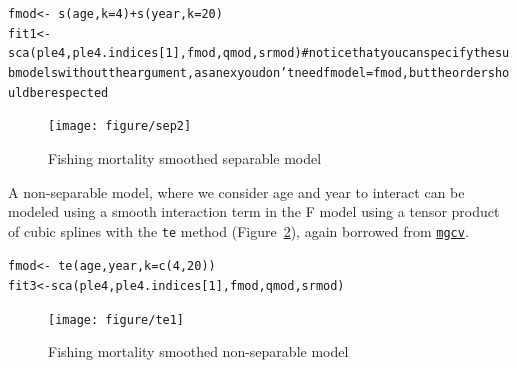 \documentclass[a4paper,english,10pt]{article}\usepackage[]{graphicx}\usepackage[]{color}
\makeatletter
\newcommand{\hlnum}[1]{\textcolor[rgb]{0.2,0.2,0.2}{#1}}%
\newcommand{\hlcom}[1]{\textcolor[rgb]{0.2,0.267,0.4}{#1}}%
\newcommand{\hlopt}[1]{\textcolor[rgb]{0.2,0.2,0.2}{#1}}%
\newcommand{\hlstd}[1]{\textcolor[rgb]{0,0,0}{#1}}%
\newcommand{\hlkwb}[1]{\textcolor[rgb]{0.361,0.506,0.596}{#1}}%
\newcommand{\hlkwc}[1]{\textcolor[rgb]{0.361,0.506,0.596}{#1}}%
\newcommand{\hlkwd}[1]{\textcolor[rgb]{0.361,0.506,0.596}{#1}}%
\newenvironment{kframe}{%
 \def\at@end@of@kframe{}%
 \ifinner\ifhmode%
  \def\at@end@of@kframe{\end{minipage}}%
  \begin{minipage}{\columnwidth}%
 \fi\fi%
 \def\FrameCommand##1{\hskip\@totalleftmargin \hskip-\fboxsep
 \colorbox{shadecolor}{##1}\hskip-\fboxsep
     \hskip-\linewidth \hskip-\@totalleftmargin \hskip\columnwidth}%
 \MakeFramed {\advance\hsize-\width
   \@totalleftmargin\z@ \linewidth\hsize
   \@setminipage}}%
 {\par\unskip\endMakeFramed%
 \at@end@of@kframe}
\newenvironment{knitrout}{}{} %
\newcommand{\code}[1]{{\texttt{#1}}}
\newcommand{\pkg}[1]{{\texttt{#1}}}
\makeatother
\begin{document}
\begin{knitrout}
\color{fgcolor}\begin{kframe}
\begin{alltt}
\hlstd{fmod} \hlkwb{<-} \hlopt{~} \hlkwd{s}\hlstd{(age,} \hlkwc{k}\hlstd{=}\hlnum{4}\hlstd{)} \hlopt{+} \hlkwd{s}\hlstd{(year,} \hlkwc{k} \hlstd{=} \hlnum{20}\hlstd{)}
\hlstd{fit1} \hlkwb{<-} \hlkwd{sca}\hlstd{(ple4, ple4.indices[}\hlnum{1}\hlstd{], fmod, qmod, srmod)} \hlcom{# notice that you can specify the submodels without the argument, as an ex you don't need fmodel=fmod, but the order should be respected}
\end{alltt}
\end{kframe}
\end{knitrout}

\begin{knitrout}
\color{fgcolor}\begin{figure}[H]


{\centering \texttt{[image: figure/sep2]} 

}

\caption[Fishing mortality smoothed separable model]{Fishing mortality smoothed separable model\label{fig:sep2}}
\end{figure}


\end{knitrout}

A non-separable model, where we consider age and year to interact can be modeled using a smooth interaction term in the F model using a tensor product of cubic splines with the \code{te} method (Figure~\ref{fig:te1}), again borrowed from \href{http://cran.r-project.org/web/packages/mgcv/index.html}{\pkg{mgcv}}. 

\begin{knitrout}
\color{fgcolor}\begin{kframe}
\begin{alltt}
\hlstd{fmod} \hlkwb{<-} \hlopt{~} \hlkwd{te}\hlstd{(age, year,} \hlkwc{k} \hlstd{=} \hlkwd{c}\hlstd{(}\hlnum{4}\hlstd{,}\hlnum{20}\hlstd{))}
\hlstd{fit3} \hlkwb{<-} \hlkwd{sca}\hlstd{(ple4, ple4.indices[}\hlnum{1}\hlstd{], fmod, qmod, srmod)}
\end{alltt}
\end{kframe}
\end{knitrout}

\begin{knitrout}
\color{fgcolor}\begin{figure}[H]


{\centering \texttt{[image: figure/te1]} 

}

\caption[Fishing mortality smoothed non-separable model]{Fishing mortality smoothed non-separable model\label{fig:te1}}
\end{figure}


\end{knitrout}
\end{document}
